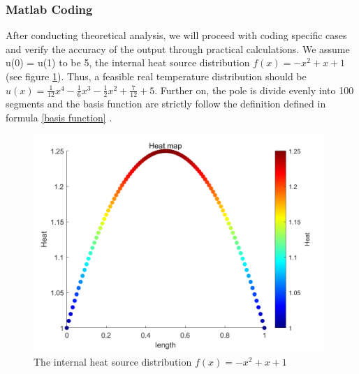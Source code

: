 \documentclass{article}
\begin{document}
    \subsubsection{Matlab Coding}
    After conducting theoretical analysis, we will proceed with coding specific cases and verify the accuracy of the output through practical calculations. We assume u(0) = u(1) to be 5, the internal heat source distribution $f(x)=-x^2+x+1$ (see figure \ref{pic_2}). Thus, a feasible real temperature distribution should be $u(x) = \frac{1}{12}x^4-\frac{1}{6}x^3-\frac{1}{2}x^2+\frac{7}{12}+5$. Further on, the pole is divide evenly into 100 segments and the basis function are strictly follow the definition defined in formula \ref{basis function} .
    \begin{figure}[H]
        \centering %
        \includegraphics[width=11cm]{pic/heat.png} %
        \caption{The internal heat source distribution $f(x)=-x^2+x+1$} %
        \label{pic_2}
    \end{figure}
    
\end{document}
